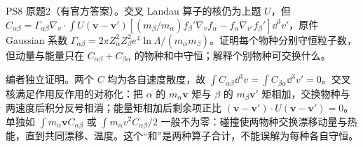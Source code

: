 \begin{exercise}\label{ex:hist02-8-2}
PS8 原题2（有官方答案）。交叉 Landau 算子的核仍为上题 $U$，但 $C_{\alpha\beta}=\Gamma_{\alpha\beta}\nabla_v\cdot\int U(\mathbf v-\mathbf v')[(m_\beta/m_\alpha)f_\beta'\nabla_v f_\alpha-f_\alpha\nabla_{v'}f_\beta']\dd^3v'$，原件 Gaussian 系数 $\Gamma_{\alpha\beta}=2\pi Z_\alpha^2Z_\beta^2e^4\ln\Lambda/(m_\alpha m_\beta)$。证明每个物种分别守恒粒子数，但动量与能量只在 $C_{\alpha\beta}+C_{\beta\alpha}$ 的物种和中守恒；解释个别物种可交换什么。
\end{exercise}
\begin{solution}
编者独立证明。两个 $C$ 均为各自速度散度，故 $\int C_{\alpha\beta}\dd^3v=\int C_{\beta\alpha}\dd^3v'=0$。交叉核满足作用反作用的对称化：把 $\alpha$ 的 $m_\alpha\mathbf v$ 矩与 $\beta$ 的 $m_\beta\mathbf v'$ 矩相加，交换物种与两速度后积分反号相消；能量矩相加后剩余项正比 $(\mathbf v-\mathbf v')\cdot U(\mathbf v-\mathbf v')=0$。单独如 $\int m_\alpha\mathbf v C_{\alpha\beta}$ 或 $\int m_\alpha v^2C_{\alpha\beta}/2$ 一般不为零：碰撞使两物种交换漂移动量与热能，直到共同漂移、温度。这个“和”是两种算子合计，不能误解为每种各自守恒。
\end{solution}

